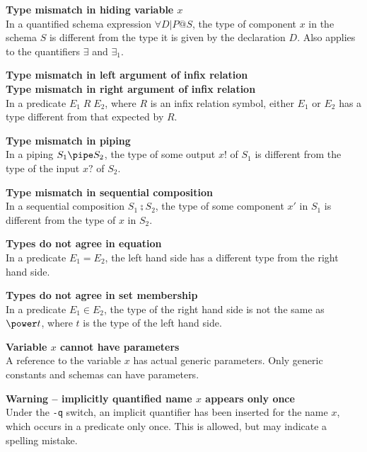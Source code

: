 {{{{{{\begin{trivlist}
\item[]{\bf Type mismatch in hiding variable $x$}\\
        In a quantified schema expression $\forall D | P @ S$, the
        type of component $x$ in the schema $S$ is different from the
        type it is given by the declaration $D$. Also applies to the
        quantifiers $\exists$ and $\exists_1$. 

\item[]
{\bf Type mismatch in left argument of infix relation}\\
{\bf Type mismatch in right argument of infix relation}\\
        In a predicate $E_1\;R\;E_2$, where $R$ is an infix relation
        symbol, either $E_1$ or $E_2$ has a type different from that
        expected by $R$. 

\item[]{\bf Type mismatch in piping}\\
        In a piping $S_1 \pipe S_2$, the type of some output $x!$ of
        $S_1$ is different from the type of the input $x?$ of
        $S_2$.  

\item[]{\bf Type mismatch in sequential composition}\\
        In a sequential composition $S_1 \semi S_2$, the type of some
        component $x'$ in $S_1$ is different from the type of $x$ in
        $S_2$.  

\item[]{\bf Types do not agree in equation}\\
        In a predicate $E_1 = E_2$, the left hand side has a different
        type from the right hand side.  

\item[]{\bf Types do not agree in set membership}\\
        In a predicate $E_1 \in E_2$, the type of the right hand side
        is not the same as $\power t$, where $t$ is the type of the
        left hand side.  

\item[]{\bf Variable $x$ cannot have parameters}\\
        A reference to the variable $x$ has actual generic
        parameters. Only generic constants and schemas can have
        parameters. 

\item[]{\bf Warning -- implicitly quantified name $x$ appears only once}%
	\\
        Under the \verb/-q/ switch, an implicit quantifier has been
        inserted for the name $x$, which occurs in a predicate only
        once.  This is allowed, but may indicate a spelling mistake.


\end{trivlist}}}}}}}
